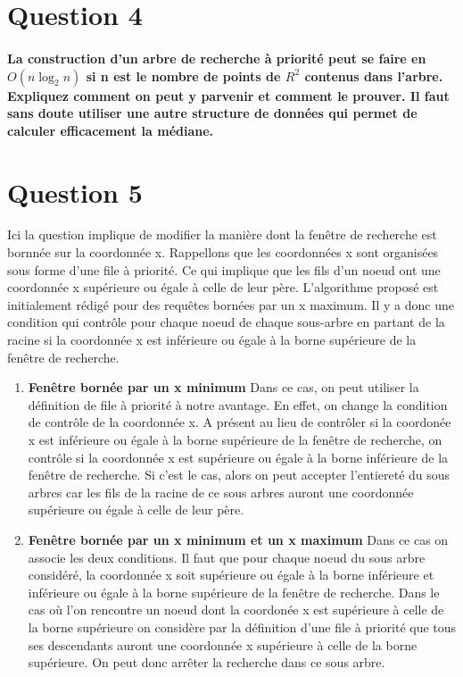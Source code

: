 \documentclass{article}
\begin{document}
\section{Question 4}
    \paragraph{La construction d’un arbre de recherche à priorité peut se faire en $O(n \log_2 n)$ si n est le
        nombre de points de $R^2$ contenus dans l’arbre. Expliquez comment on peut y parvenir et
    comment le prouver. Il faut sans doute utiliser une autre structure de données qui permet
    de calculer efficacement la médiane.}

\section{Question 5}
Ici la question implique de modifier la manière dont la fenêtre de recherche est bornnée sur la coordonnée x. Rappellons que les coordonnées x sont organisées sous forme d'une file à priorité.
Ce qui implique que les fils d'un noeud ont une coordonnée x supérieure ou égale à celle de leur père. L'algorithme proposé est initialement rédigé pour des requêtes bornées par un x maximum. Il y a donc
une condition qui contrôle pour chaque noeud de chaque sous-arbre en partant de la racine si la coordonnée x est inférieure ou égale à la borne supérieure de la fenêtre de recherche. \\

    \begin{enumerate}
        \item \textbf{Fenêtre bornée par un x minimum} Dans ce cas, on peut utiliser la définition de file à priorité à notre avantage. En effet, on change la condition de contrôle de la coordonnée x.
        A présent au lieu de contrôler si la coordonée x est inférieure ou égale à la borne supérieure de la fenêtre de recherche, on contrôle si la coordonnée x est supérieure ou égale à la borne inférieure de la fenêtre de recherche.
        Si c'est le cas, alors on peut accepter l'entiereté du sous arbres car les fils de la racine de ce sous arbres auront une coordonnée supérieure ou égale à celle de leur père.
        \item \textbf{Fenêtre bornée par un x minimum et un x maximum} Dans ce cas on associe les deux conditions. Il faut que pour chaque noeud du sous arbre considéré, la coordonnée x soit supérieure ou égale à la borne inférieure et
        inférieure ou égale à la borne supérieure de la fenêtre de recherche. Dans le cas où l'on rencontre un noeud dont la coordonée x est supérieure à celle de la borne supérieure on considère par la définition
        d'une file à priorité que tous ses descendants auront une coordonnée x supérieure à celle de la borne supérieure. On peut donc arrêter la recherche dans ce sous arbre.
    \end{enumerate}
\end{document}
